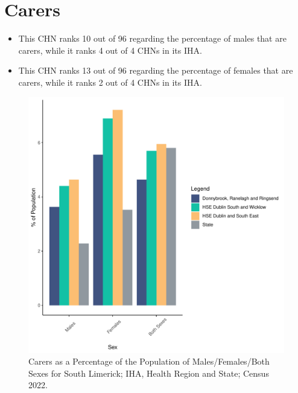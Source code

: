 \documentclass{article}
\begin{document}
\section{Carers}\label{sect:Carers}
\begin{itemize}
\item This CHN ranks  10 out of 96 regarding the percentage of males that are carers, while it ranks   4 out of 4 CHNs in its IHA.
\item This CHN ranks  13 out of 96 regarding the percentage of females that are carers, while it ranks   2 out of 4 CHNs in its IHA.
\end{itemize}
\begin{figure}[H]
	\centering
	\includegraphics[width = 150mm]{../figures/CareED.pdf}
	\caption{Carers as a Percentage of the Population of Males/Females/Both Sexes for South Limerick; IHA, Health Region and State; Census 2022.}
	\label{fig:2ae19629-1a6a-13a3-e055-000000000001}
	\end{figure}
\end{document}
